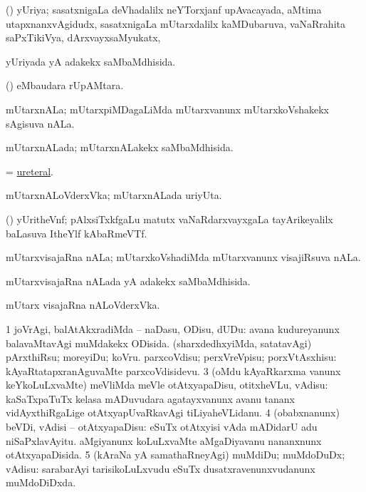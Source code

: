\bentry
{} 
\gl{\nA}
\expl{}
\bmng
(\jiVra) yUriya; sasatxnigaLa deVhadalilx neYTorxjanf upAvacayada, aMtima utapxnanxvAgidudx, sasatxnigaLa mUtarxdalilx kaMDubaruva, vaNaRrahita saPxTikiVya, dArxvayxsaMyukatx,  
\emng
\eentry

\bentry
{} 
\gl{\gu}
\expl{}
\bmng
yUriyada yA adakekx saMbaMdhisida. 
\emng
\eentry

\bentry
{} 
\gl{\nA}
\expl{}
\bmng
(\ame)  eMbaudara rUpAMtara. 
\emng
\eentry

\bentry
{} 
\gl{\nA}
\expl{}
\bmng
mUtarxnALa; mUtarxpiMDagaLiMda mUtarxvanunx mUtarxkoVshakekx sAgisuva nALa. 
\emng
\eentry

\bentry
{} 
\gl{\gu}
\expl{}
\bmng
mUtarxnALada; mUtarxnALakekx saMbaMdhisida. 
\emng
\eentry

\bentry
{} 
\gl{\gu}
\expl{}
\bmng
= \hyperlink{ureteral}{ureteral}. 
\emng
\eentry

\bentry
{} 
\gl{\nA}
\expl{}
\bmng
mUtarxnALoVderxVka; mUtarxnALada uriyUta. 
\emng
\eentry

\bentry
{} 
\gl{\nA}
\expl{}
\bmng
(\ravi) yUritheVnf; pAlxsiTxkfgaLu matutx vaNaRdarxvayxgaLa tayArikeyalilx baLasuva ItheYlf kAbaRmeVTf. 
\emng
\eentry

\bentry
{} 
\gl{\nA}
\bmng
mUtarxvisajaRna nALa; mUtarxkoVshadiMda mUtarxvanunx visajiRsuva nALa. 
\emng
\eentry

\bentry
{} 
\gl{\gu}
\expl{}
\bmng
mUtarxvisajaRna nALada yA adakekx saMbaMdhisida. 
\emng
\eentry

\bentry
{} 
\gl{\nA}
\expl{}
\bmng
mUtarx visajaRna nALoVderxVka. 
\emng
\eentry

\bentry
{} 
\gl{\sakirx}
\expl{}
\bmng
\bnum
\num{1} joVrAgi, balAtAkxradiMda -- naDasu, ODisu, dUDu:  avana kudureyanunx balavaMtavAgi muMdakekx ODisida. 
 (sharxdedhxyiMda, satatavAgi) 
\banum
{} pArxthiRsu; moreyiDu; koVru. 
 parxcoVdisu; perxVreVpisu; porxVtAsxhisu:  kAyaRtatapxranAguvaMte parxcoVdisidevu. 
\eanum
\numie
\num{3} (oMdu kAyaRkarxma \mo vanunx keYkoLuLxvaMte) meVliMda meVle otAtxyapaDisu, otitxheVLu, vAdisu:  kaSaTxpaTuTx kelasa mADuvudara agatayxvanunx avanu tananx vidAyxthiRgaLige otAtxyapUvaRkavAgi tiLiyaheVLidanu. 
\num{4} (obabxnanunx) beVDi, vAdisi -- otAtxyapaDisu:  eSuTx otAtxyisi vAda mADidarU adu niSaPxlavAyitu.  aMgiyanunx koLuLxvaMte aMgaDiyavanu nananxnunx otAtxyapaDisida. 
\num{5} (kAraNa yA samathaRneyAgi) muMdiDu; muMdoDuDx; vAdisu:  sarabarAyi tarisikoLuLxvudu eSuTx dusatxravenunxvudanunx muMdoDiDxda. 
\enum
\emng


